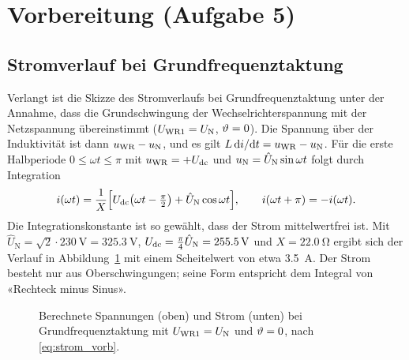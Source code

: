 \section{Vorbereitung (Aufgabe 5)}
\label{sec:vorbereitung}

\subsection{Stromverlauf bei Grundfrequenztaktung}

Verlangt ist die Skizze des Stromverlaufs bei Grundfrequenztaktung unter der Annahme, dass die Grundschwingung der Wechselrichterspannung mit der Netzspannung übereinstimmt ($U_{\mathrm{WR1}}=U_{\mathrm{N}}$, $\vartheta=0$). Die Spannung über der Induktivität ist dann $u_{\mathrm{WR}}-u_{\mathrm{N}}$, und es gilt $L\,\mathrm{d}i/\mathrm{d}t=u_{\mathrm{WR}}-u_{\mathrm{N}}$. Für die erste Halbperiode $0\le\omega t\le\pi$ mit $u_{\mathrm{WR}}=+U_{\mathrm{dc}}$ und $u_{\mathrm{N}}=\hat U_{\mathrm N}\sin\omega t$ folgt durch Integration
\begin{equation}
  i(\omega t)=\frac{1}{X}\Bigl[U_{\mathrm{dc}}\bigl(\omega t-\tfrac{\pi}{2}\bigr)+\hat U_{\mathrm N}\cos\omega t\Bigr],
  \qquad i(\omega t+\pi)=-i(\omega t).
  \label{eq:strom_vorb}
\end{equation}
Die Integrationskonstante ist so gewählt, dass der Strom mittelwertfrei ist. Mit $\hat U_{\mathrm N}=\sqrt2\cdot\SI{230}{\volt}=\SI{325.3}{\volt}$, $U_{\mathrm{dc}}=\tfrac{\pi}{4}\hat U_{\mathrm N}=\SI{255.5}{\volt}$ und $X=\SI{22.0}{\ohm}$ ergibt sich der Verlauf in Abbildung~\ref{fig:strom_vorb} mit einem Scheitelwert von etwa \SI{3.5}{\ampere}. Der Strom besteht nur aus Oberschwingungen; seine Form entspricht dem Integral von «Rechteck minus Sinus».

\begin{figure}[htbp]
  \centering

  \caption{Berechnete Spannungen (oben) und Strom (unten) bei Grundfrequenztaktung mit $U_{\mathrm{WR1}}=U_{\mathrm{N}}$ und $\vartheta=0$, nach \eqref{eq:strom_vorb}.}
  \label{fig:strom_vorb}
\end{figure}

